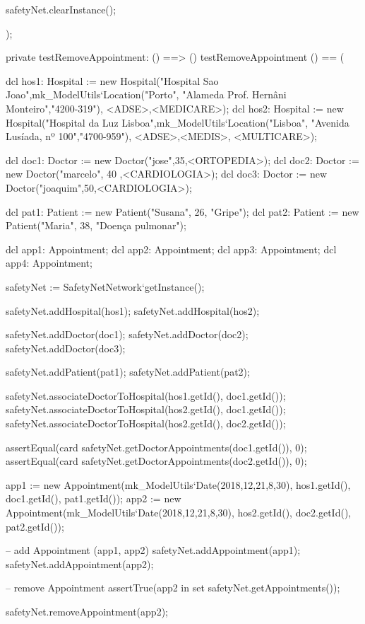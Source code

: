 \begin{vdmpp}[breaklines=true]
  
  safetyNet.clearInstance();
    
);


 
private testRemoveAppointment: () ==> ()
 testRemoveAppointment () == (
 
  dcl hos1: Hospital := new Hospital("Hospital Sao Joao",mk_ModelUtils`Location("Porto", "Alameda Prof. Hernâni Monteiro","4200-319"), {<ADSE>,<MEDICARE>});
  dcl hos2: Hospital := new Hospital("Hospital da Luz Lisboa",mk_ModelUtils`Location("Lisboa", "Avenida Lusíada, nº 100","4700-959"), {<ADSE>,<MEDIS>, <MULTICARE>});
  
  dcl doc1: Doctor := new Doctor("jose",35,<ORTOPEDIA>);
  dcl doc2: Doctor := new Doctor("marcelo", 40 ,<CARDIOLOGIA>);
  dcl doc3: Doctor := new Doctor("joaquim",50,<CARDIOLOGIA>);
  
  dcl pat1: Patient := new Patient("Susana", 26, "Gripe");
  dcl pat2: Patient := new Patient("Maria", 38, "Doença pulmonar");
  
  dcl app1: Appointment;
  dcl app2: Appointment;
  dcl app3: Appointment;
  dcl app4: Appointment;
  
  safetyNet := SafetyNetNetwork`getInstance();
   
  safetyNet.addHospital(hos1);
  safetyNet.addHospital(hos2);
  
  safetyNet.addDoctor(doc1);
  safetyNet.addDoctor(doc2);
  safetyNet.addDoctor(doc3);
  
  safetyNet.addPatient(pat1);
  safetyNet.addPatient(pat2);

  safetyNet.associateDoctorToHospital(hos1.getId(), doc1.getId());
  safetyNet.associateDoctorToHospital(hos2.getId(), doc1.getId());
  safetyNet.associateDoctorToHospital(hos2.getId(), doc2.getId());

  assertEqual(card safetyNet.getDoctorAppointments(doc1.getId()), 0);
  assertEqual(card safetyNet.getDoctorAppointments(doc2.getId()), 0);

  app1 := new Appointment(mk_ModelUtils`Date(2018,12,21,8,30), hos1.getId(), doc1.getId(), pat1.getId());
  app2 := new Appointment(mk_ModelUtils`Date(2018,12,21,8,30), hos2.getId(), doc2.getId(), pat2.getId());

  
  -- add Appointment (app1, app2)
  safetyNet.addAppointment(app1);
  safetyNet.addAppointment(app2);


  -- remove Appointment
  assertTrue(app2 in set safetyNet.getAppointments());
  
  safetyNet.removeAppointment(app2);
  

\end{vdmpp}
